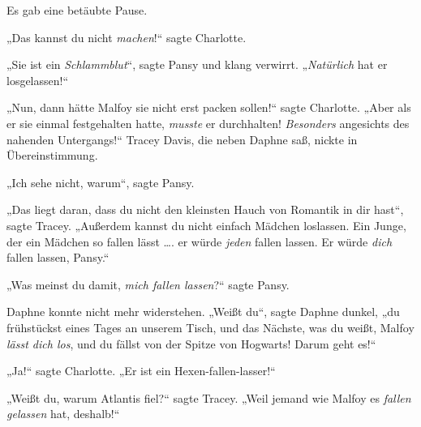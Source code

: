 Es gab eine betäubte Pause.

„Das kannst du nicht \emph{machen}!“ sagte Charlotte.

„Sie ist ein \emph{Schlammblut}“, sagte Pansy und klang verwirrt.
„\emph{Natürlich} hat er losgelassen!“

„Nun, dann hätte Malfoy sie nicht erst packen sollen!“ sagte Charlotte.
„Aber als er sie einmal festgehalten hatte, \emph{musste} er durchhalten! \emph{Besonders} angesichts des nahenden Untergangs!“ Tracey Davis, die neben Daphne saß, nickte in Übereinstimmung.

„Ich sehe nicht, warum“, sagte Pansy.

„Das liegt daran, dass du nicht den kleinsten Hauch von Romantik in dir hast“, sagte Tracey.
„Außerdem kannst du nicht einfach Mädchen loslassen. Ein Junge, der ein Mädchen so fallen lässt …. er würde \emph{jeden} fallen lassen. Er würde \emph{dich} fallen lassen, Pansy.“

„Was meinst du damit, \emph{mich fallen lassen}?“ sagte Pansy.

Daphne konnte nicht mehr widerstehen.
„Weißt du“, sagte Daphne dunkel, „du frühstückst eines Tages an unserem Tisch, und das Nächste, was du weißt, Malfoy \emph{lässt dich los}, und du fällst von der Spitze von Hogwarts! Darum geht es!“

„Ja!“ sagte Charlotte.
„Er ist ein Hexen-fallen-lasser!“

„Weißt du, warum Atlantis fiel?“ sagte Tracey.
„Weil jemand wie Malfoy es \emph{fallen gelassen} hat, deshalb!“

